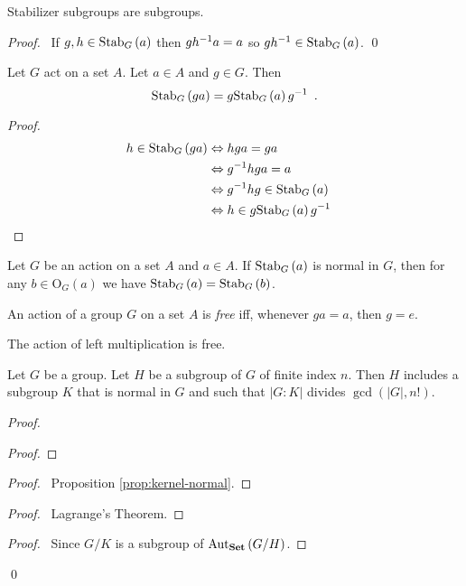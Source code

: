 \begin{prop}
Stabilizer subgroups are subgroups.
\end{prop}

\begin{proof}
\pf\ If $g,h \in \mathrm{Stab}_{G} \left( {a} \right)$ then $g {h}^{-1} a = a$ so $g {h}^{-1} \in \mathrm{Stab}_{G} \left( {a} \right)$. \qed
\end{proof}

\begin{prop}
Let $G$ act on a set $A$. Let $a \in A$ and $g \in G$. Then
\[ \mathrm{Stab}_{G} \left( {ga} \right) = g \mathrm{Stab}_{G} \left( {a} \right) {g}^{-1} \enspace . \]
\end{prop}

\begin{proof}
\pf
\begin{align*}
h \in \mathrm{Stab}_{G} \left( {ga} \right) & \Leftrightarrow hga = ga \\
& \Leftrightarrow {g}^{-1}hga = a \\
& \Leftrightarrow {g}^{-1}hg \in \mathrm{Stab}_{G} \left( {a} \right) \\
& \Leftrightarrow h \in g \mathrm{Stab}_{G} \left( {a} \right) {g}^{-1} & \relax
\end{align*}
\end{proof}

\begin{cor}
Let $G$ be an action on a set $A$ and $a \in A$. If $\mathrm{Stab}_{G} \left( {a} \right)$ is normal in $G$, then for any $b \in \mathrm{O}_G(a)$ we have $\mathrm{Stab}_{G} \left( {a} \right) = \mathrm{Stab}_{G} \left( {b} \right)$.
\end{cor}

\begin{df}[Free]
An action of a group $G$ on a set $A$ is \emph{free} iff, whenever $ga = a$, then $g = e$.
\end{df}

\begin{ex}
The action of left multiplication is free.
\end{ex}

\begin{prop}
Let $G$ be a group. Let $H$ be a subgroup of $G$ of finite index $n$. Then $H$ includes a subgroup $K$ that is normal in $G$ and such that $|G:K|$ divides $\gcd(|G|,n!)$.
\end{prop}

\begin{proof}
\pf
{}
\begin{proof}
\end{proof}
\begin{proof}
	\pf\ Proposition \ref{prop:kernel-normal}.
\end{proof}
\begin{proof}
	\pf\ Lagrange's Theorem.
\end{proof}
\begin{proof}
	\pf\ Since $G / K$ is a subgroup of $\mathrm{Aut}_{\mathbf{Set}} \left( {G/H} \right)$.
\end{proof}
\qed
\end{proof}

